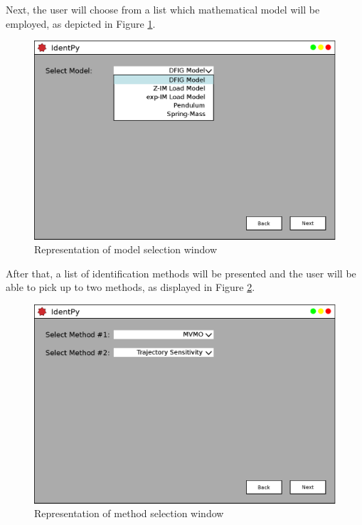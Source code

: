 Next, the user will choose from a list which mathematical model will be employed, as depicted in Figure \ref{fig: pg1}. 

\begin{figure}[h]
	\caption{Representation of model selection window}
	\begin{center}
		\includegraphics[scale=.5]{Images/Software_pg1.eps}
	\end{center}
	\label{fig: pg1}
\end{figure}

After that, a list of identification methods will be presented and the user will be able to pick up to two methods, as displayed in Figure \ref{fig: pg2}.

\begin{figure}[h]
	\caption{Representation of method selection window}
	\begin{center}
		\includegraphics[scale=.5]{Images/Software_pg2.eps}
	\end{center}
	\label{fig: pg2}
\end{figure}


